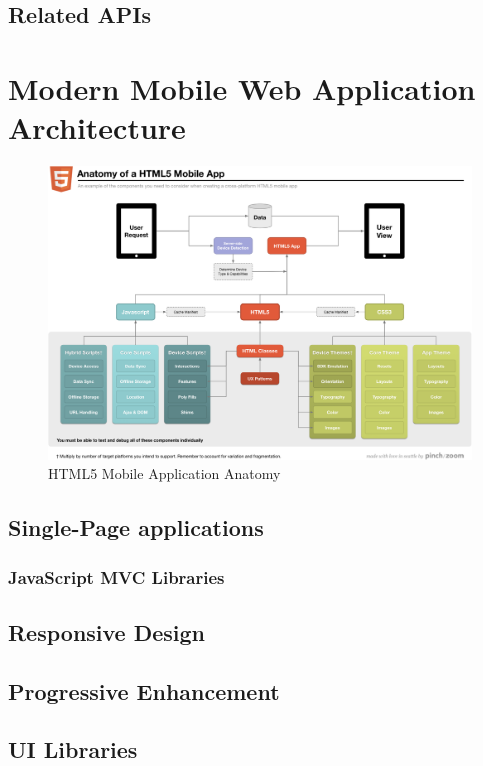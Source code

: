 \subsection{Related APIs}

\section{Modern Mobile Web Application Architecture}
\label{section:modern-mobile-web}

\begin{figure}[ht]
  \includegraphics[width=\textwidth]{images/anatomy-of-a-html5-mobile-app.png}
  \caption{HTML5 Mobile Application Anatomy \citationneeded}
  \label{figure:anatomy-of-a-html5-mobile-app.png}
\end{figure}

\subsection{Single-Page applications}
\subsubsection{JavaScript MVC Libraries}

\subsection{Responsive Design}
\subsection{Progressive Enhancement}

\subsection{UI Libraries}
